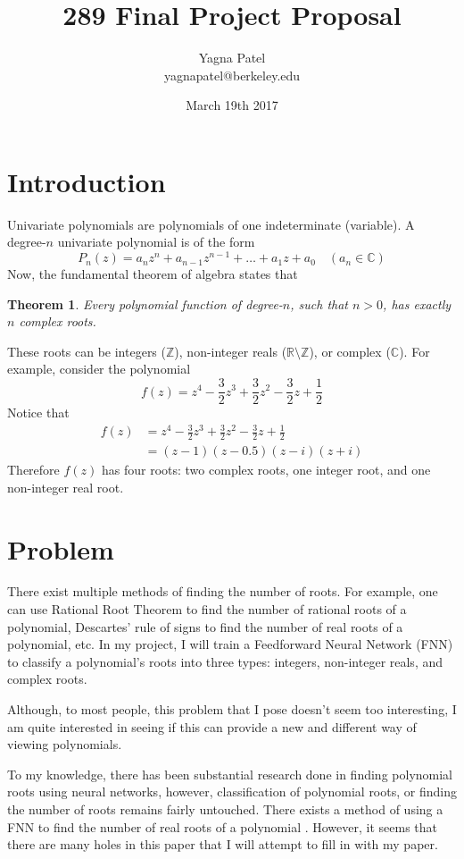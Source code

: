 \documentclass{article}
\title{289 Final Project Proposal}
\author{Yagna Patel \\ yagnapatel@berkeley.edu}
\date{March 19th 2017}
\newtheorem{theorem}{Theorem}
\begin{document}
\maketitle

\section{Introduction}
Univariate polynomials are polynomials of one indeterminate (variable). A degree-$n$ univariate polynomial is of the form $$P_n(z) = a_nz^n + a_{n-1}z^{n-1} + \ldots + a_1z + a_0\quad (a_n\in\mathbb{C})$$ Now, the fundamental theorem of algebra states that \begin{theorem}Every polynomial function of degree-$n$, such that $n>0$, has exactly $n$ complex roots.\end{theorem} \noindent These roots can be integers ($\mathbb{Z}$), non-integer reals ($\mathbb{R}\setminus\mathbb{Z}$), or complex ($\mathbb{C}$). For example, consider the polynomial $$f(z) = z^4-\frac{3}{2}z^3+\frac{3}{2}z^2-\frac{3}{2}z+\frac{1}{2}$$ Notice that \begin{align*}f(z) &= z^4-\frac{3}{2}z^3+\frac{3}{2}z^2-\frac{3}{2}z+\frac{1}{2} \\&= (z-1)(z-0.5)(z-i)(z+i)\end{align*} Therefore $f(z)$ has four roots: two complex roots, one integer root, and one non-integer real root.

\section{Problem}
There exist multiple methods of finding the number of roots. For example, one can use Rational Root Theorem to find the number of rational roots of a polynomial, Descartes' rule of signs to find the number of real roots of a polynomial, etc. In my project, I will train a Feedforward Neural Network (FNN) to classify a polynomial's roots into three types: integers, non-integer reals, and complex roots. 
\vspace{4pt}

\noindent Although, to most people, this problem that I pose doesn't seem too interesting, I am quite interested in seeing if this can provide a new and different way of viewing polynomials. 

\vspace{4pt}

\noindent To my knowledge, there has been substantial research done in finding polynomial roots using neural networks, however, classification of polynomial roots, or finding the number of roots remains fairly untouched. There exists a method of using a FNN to find the number of real roots of a polynomial \cite{real_roots}. However, it seems that there are many holes in this paper that I will attempt to fill in with my paper. 
\end{document}
